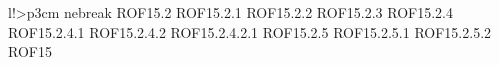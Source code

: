 \begin{tabella}{l!{\VRule}>{\centering\arraybackslash}p{3cm}}
nebreak ROF15.2 \linebreak ROF15.2.1 \linebreak ROF15.2.2 \linebreak ROF15.2.3 \linebreak ROF15.2.4 \linebreak ROF15.2.4.1 \linebreak ROF15.2.4.2 \linebreak ROF15.2.4.2.1 \linebreak ROF15.2.5 \linebreak ROF15.2.5.1 \linebreak ROF15.2.5.2 \linebreak ROF15
\end{tabella}

